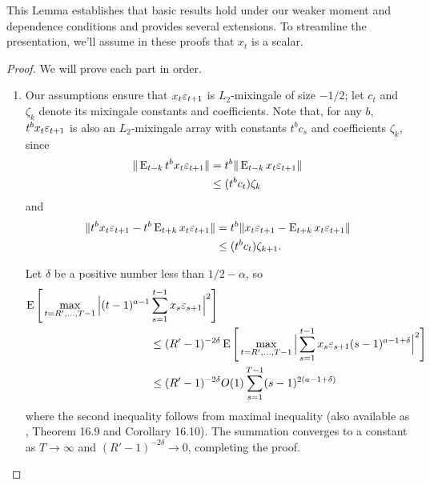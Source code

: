 \documentclass[12pt,fleqn]{article}
\begin{document}
This Lemma establishes that  basic results hold under
our weaker moment and dependence conditions and provides several
extensions. To streamline the presentation, we'll assume in these
proofs that $x_t$ is a scalar.
\begin{proof}
  We will prove each part in order.
  \begin{enumerate}
  \item Our assumptions ensure that $x_t \varepsilon_{t+1}$ is $L_2$-mixingale
    of size $-1/2$; let $c_t$ and $\zeta_k$ denote its mixingale
    constants and coefficients. Note that, for any $b$, $t^{b} x_t \varepsilon_{t+1}$ is
    also an $L_2$-mixingale array with constants $t^{b} c_s$ and
    coefficients $\zeta_k$, since
    \begin{align*}
      \| \operatorname{E}_{t-k} t^{b} x_t \varepsilon_{t+1} \| &= t^{b} \| \operatorname{E}_{t-k} x_t \varepsilon_{t+1} \| \\
      &\leq (t^{b} c_t) \zeta_k
    \end{align*}
    and
    \begin{align*}
      \| t^{b} x_t \varepsilon_{t+1} - t^{b} \operatorname{E}_{t+k} x_t \varepsilon_{t+1} \| &= t^{b} \|  x_t \varepsilon_{t+1} - \operatorname{E}_{t+k} x_t \varepsilon_{t+1} \| \\
      &\leq (t^{b} c_t) \zeta_{k+1}.
    \end{align*}

    Let $\delta$ be a positive number less than $1/2 - \alpha$, so
    \begin{align*}
      \operatorname{E}\Bigg[\max_{t=R',\dots,T-1} \Big|(t-1)^{a-1} & \sum_{s=1}^{t-1} x_s \varepsilon_{s+1} \Big|^2\Bigg] \\
      &\leq (R'-1)^{-2\delta} \operatorname{E}\Bigg[\max_{t=R',\dots,T-1} \Big| \sum_{s=1}^{t-1} x_s \varepsilon_{s+1} (s-1)^{a-1+\delta} \Big|^2\Bigg] \\
      &\leq (R'-1)^{-2\delta} O(1) \sum_{s=1}^{T-1} (s-1)^{2(a - 1 + \delta)}
    \end{align*}
    where the second inequality follows from  maximal
    inequality (also available as \citealp{Dav:94}, Theorem 16.9 and
    Corollary 16.10). The summation converges to a constant as $T \to
    \infty$ and $(R'-1)^{-2\delta} \to 0$, completing the proof.


\end{enumerate}
\end{proof}
\end{document}
